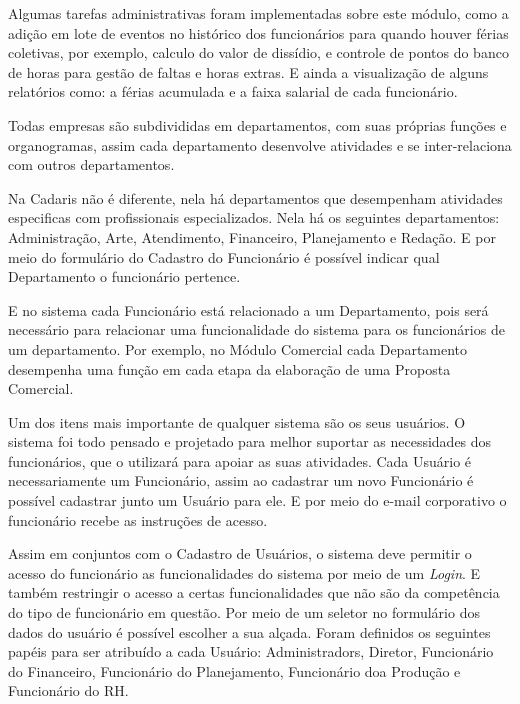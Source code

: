 \documentclass[
  12pt,				%
  openany,
  oneside,
  a4paper,			%
  english,			%
  brazil
]{article}
\numberwithin{figure}{section}
\numberwithin{table}{section}
\newcounter{subsubsubsection}[subsubsection]
\begin{document}
Algumas tarefas administrativas foram implementadas sobre este módulo, como a adição em lote de eventos no histórico dos funcionários para quando houver férias coletivas, por exemplo, calculo do valor de dissídio, e controle de pontos do banco de horas para gestão de faltas e horas extras. E ainda a visualização de alguns relatórios como: a férias acumulada e a faixa salarial de cada funcionário.



Todas empresas são subdivididas em departamentos, com suas próprias funções e organogramas, assim cada departamento desenvolve atividades e se inter-relaciona com outros departamentos.

Na Cadaris não é diferente, nela há departamentos que desempenham atividades especificas com profissionais especializados. Nela há os seguintes departamentos: Administração, Arte, Atendimento, Financeiro, Planejamento e Redação. E por meio do formulário do Cadastro do Funcionário é possível indicar qual Departamento o funcionário pertence.

E no sistema cada Funcionário está relacionado a um Departamento, pois será necessário para relacionar uma funcionalidade do sistema para os funcionários de um departamento. Por exemplo, no Módulo Comercial cada Departamento desempenha uma função em cada etapa da elaboração de uma Proposta Comercial.



Um dos itens mais importante de qualquer sistema são os seus usuários. O sistema foi todo pensado e projetado para melhor suportar as necessidades dos funcionários, que o utilizará para apoiar as suas atividades. Cada Usuário é necessariamente um Funcionário, assim ao cadastrar um novo Funcionário é possível cadastrar junto um Usuário para ele. E por meio do e-mail corporativo o funcionário recebe as instruções de acesso.

Assim em conjuntos com o Cadastro de Usuários, o sistema deve permitir o acesso do funcionário as funcionalidades do sistema por meio de um \textit{Login}. E também restringir o acesso a certas funcionalidades que não são da competência do tipo de funcionário em questão. Por meio de um seletor no formulário dos dados do usuário é possível escolher a sua alçada. Foram definidos os seguintes papéis para ser atribuído a cada Usuário: Administradors, Diretor, Funcionário do Financeiro, Funcionário do Planejamento, Funcionário doa Produção e Funcionário do RH.
\end{document}
